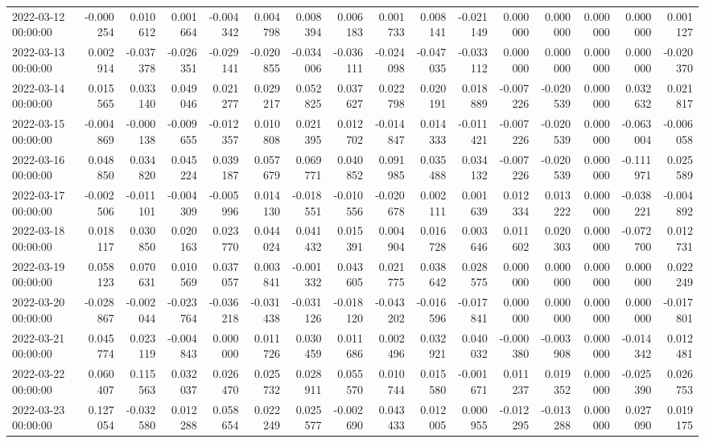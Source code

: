 \begin{tabular}{lrrrrrrrrrrrrrrr}
2022-03-12 00:00:00 & -0.000254 & 0.010612 & 0.001664 & -0.004342 & 0.004798 & 0.008394 & 0.006183 & 0.001733 & 0.008141 & -0.021149 & 0.000000 & 0.000000 & 0.000000 & 0.000000 & 0.001127 \\
2022-03-13 00:00:00 & 0.002914 & -0.037378 & -0.026351 & -0.029141 & -0.020855 & -0.034006 & -0.036111 & -0.024098 & -0.047035 & -0.033112 & 0.000000 & 0.000000 & 0.000000 & 0.000000 & -0.020370 \\
2022-03-14 00:00:00 & 0.015565 & 0.033140 & 0.049046 & 0.021277 & 0.029217 & 0.052825 & 0.037627 & 0.022798 & 0.020191 & 0.018889 & -0.007226 & -0.020539 & 0.000000 & 0.032632 & 0.021817 \\
2022-03-15 00:00:00 & -0.004869 & -0.000138 & -0.009655 & -0.012357 & 0.010808 & 0.021395 & 0.012702 & -0.014847 & 0.014333 & -0.011421 & -0.007226 & -0.020539 & 0.000000 & -0.063004 & -0.006058 \\
2022-03-16 00:00:00 & 0.048850 & 0.034820 & 0.045224 & 0.039187 & 0.057679 & 0.069771 & 0.040852 & 0.091985 & 0.035488 & 0.034132 & -0.007226 & -0.020539 & 0.000000 & -0.111971 & 0.025589 \\
2022-03-17 00:00:00 & -0.002506 & -0.011101 & -0.004309 & -0.005996 & 0.014130 & -0.018551 & -0.010556 & -0.020678 & 0.002111 & 0.001639 & 0.012334 & 0.013222 & 0.000000 & -0.038221 & -0.004892 \\
2022-03-18 00:00:00 & 0.018117 & 0.030850 & 0.020163 & 0.023770 & 0.044024 & 0.041432 & 0.015391 & 0.004904 & 0.016728 & 0.003646 & 0.011602 & 0.020303 & 0.000000 & -0.072700 & 0.012731 \\
2022-03-19 00:00:00 & 0.058123 & 0.070631 & 0.010569 & 0.037057 & 0.003841 & -0.001332 & 0.043605 & 0.021775 & 0.038642 & 0.028575 & 0.000000 & 0.000000 & 0.000000 & 0.000000 & 0.022249 \\
2022-03-20 00:00:00 & -0.028867 & -0.002044 & -0.023764 & -0.036218 & -0.031438 & -0.031126 & -0.018120 & -0.043202 & -0.016596 & -0.017841 & 0.000000 & 0.000000 & 0.000000 & 0.000000 & -0.017801 \\
2022-03-21 00:00:00 & 0.045774 & 0.023119 & -0.004843 & 0.000000 & 0.011726 & 0.030459 & 0.011686 & 0.002496 & 0.032921 & 0.040032 & -0.000380 & -0.003908 & 0.000000 & -0.014342 & 0.012481 \\
2022-03-22 00:00:00 & 0.060407 & 0.115563 & 0.032037 & 0.026470 & 0.025732 & 0.028911 & 0.055570 & 0.010744 & 0.015580 & -0.001671 & 0.011237 & 0.019352 & 0.000000 & -0.025390 & 0.026753 \\
2022-03-23 00:00:00 & 0.127054 & -0.032580 & 0.012288 & 0.058654 & 0.022249 & 0.025577 & -0.002690 & 0.043433 & 0.012005 & 0.000955 & -0.012295 & -0.013288 & 0.000000 & 0.027090 & 0.019175 \\

\end{tabular}
